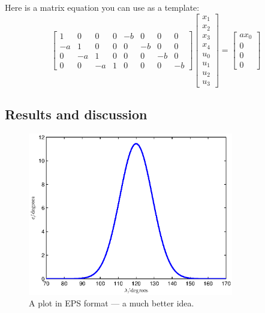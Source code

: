 Here is a matrix equation you can use as a template:
\begin{equation}
\begin{bmatrix}
 1 &  0 &  0 & 0 & -b &  0 &  0 &  0 \\
-a &  1 &  0 & 0 &  0 & -b &  0 &  0 \\
 0 & -a &  1 & 0 &  0 &  0 & -b &  0 \\
 0 &  0 & -a & 1 &  0 &  0 &  0 & -b                                
\end{bmatrix}
\begin{bmatrix} x_1 \\ x_2 \\ x_3 \\ x_4 \\ u_0 \\ u_1 \\ u_2 \\ u_3 \end{bmatrix}
=
\begin{bmatrix}
ax_0 \\ 0 \\ 0 \\ 0      
\end{bmatrix}
\end{equation}

\subsection{Results and discussion}

\begin{figure}[htb]
	\centering
		\includegraphics[width=0.8\textwidth]{figures/constraint_eps.eps}
	\caption{A plot in EPS format --- a much better idea.}
	\label{fig:constraint_eps}
\end{figure}

